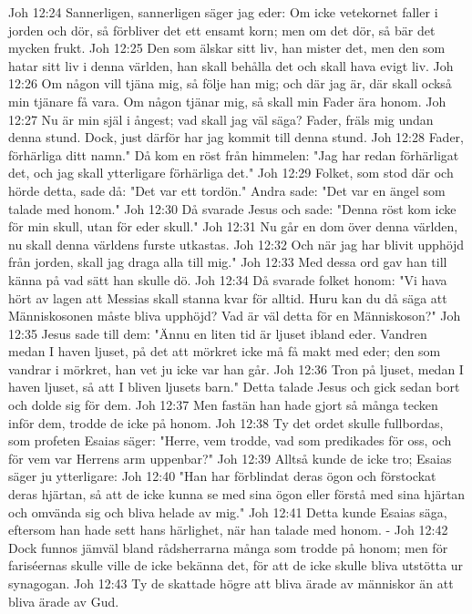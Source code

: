 Joh 12:24  Sannerligen, sannerligen säger jag eder: Om icke vetekornet faller i jorden och dör, så förbliver det ett ensamt korn; men om det dör, så bär det mycken frukt.
Joh 12:25  Den som älskar sitt liv, han mister det, men den som hatar sitt liv i denna världen, han skall behålla det och skall hava evigt liv.
Joh 12:26  Om någon vill tjäna mig, så följe han mig; och där jag är, där skall också min tjänare få vara. Om någon tjänar mig, så skall min Fader ära honom.
Joh 12:27  Nu är min själ i ångest; vad skall jag väl säga? Fader, fräls mig undan denna stund. Dock, just därför har jag kommit till denna stund.
Joh 12:28  Fader, förhärliga ditt namn." Då kom en röst från himmelen: "Jag har redan förhärligat det, och jag skall ytterligare förhärliga det."
Joh 12:29  Folket, som stod där och hörde detta, sade då: "Det var ett tordön." Andra sade: "Det var en ängel som talade med honom."
Joh 12:30  Då svarade Jesus och sade: "Denna röst kom icke för min skull, utan för eder skull."
Joh 12:31  Nu går en dom över denna världen, nu skall denna världens furste utkastas.
Joh 12:32  Och när jag har blivit upphöjd från jorden, skall jag draga alla till mig."
Joh 12:33  Med dessa ord gav han till känna på vad sätt han skulle dö.
Joh 12:34  Då svarade folket honom: "Vi hava hört av lagen att Messias skall stanna kvar för alltid. Huru kan du då säga att Människosonen måste bliva upphöjd? Vad är väl detta för en Människoson?"
Joh 12:35  Jesus sade till dem: "Ännu en liten tid är ljuset ibland eder. Vandren medan I haven ljuset, på det att mörkret icke må få makt med eder; den som vandrar i mörkret, han vet ju icke var han går.
Joh 12:36  Tron på ljuset, medan I haven ljuset, så att I bliven ljusets barn." Detta talade Jesus och gick sedan bort och dolde sig för dem.
Joh 12:37  Men fastän han hade gjort så många tecken inför dem, trodde de icke på honom.
Joh 12:38  Ty det ordet skulle fullbordas, som profeten Esaias säger: "Herre, vem trodde, vad som predikades för oss, och för vem var Herrens arm uppenbar?"
Joh 12:39  Alltså kunde de icke tro; Esaias säger ju ytterligare:
Joh 12:40  "Han har förblindat deras ögon och förstockat deras hjärtan, så att de icke kunna se med sina ögon eller förstå med sina hjärtan och omvända sig och bliva helade av mig."
Joh 12:41  Detta kunde Esaias säga, eftersom han hade sett hans härlighet, när han talade med honom. -
Joh 12:42  Dock funnos jämväl bland rådsherrarna många som trodde på honom; men för fariséernas skulle ville de icke bekänna det, för att de icke skulle bliva utstötta ur synagogan.
Joh 12:43  Ty de skattade högre att bliva ärade av människor än att bliva ärade av Gud.

